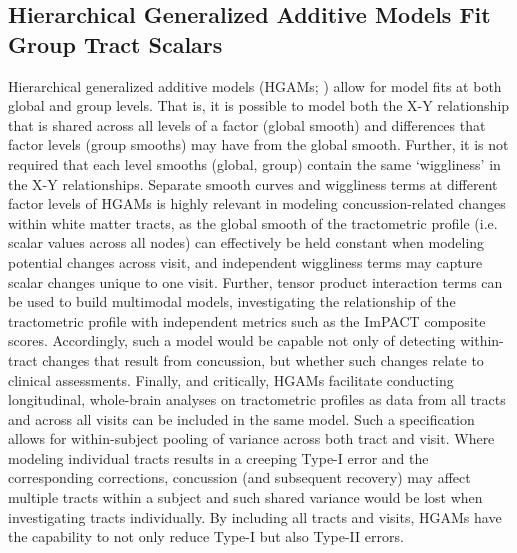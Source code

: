 \documentclass[]{imag-ms-template}
\begin{document}
\subsection{Hierarchical Generalized Additive Models Fit Group Tract Scalars}
\label{ssec:meth-gam}
Hierarchical generalized additive models (HGAMs; \cite{pedersen2019HierarchicalGeneralizedAdditive}) allow for model fits at both global and group levels. That is, it is possible to model both the X-Y relationship that is shared across all levels of a factor (global smooth) and differences that factor levels (group smooths) may have from the global smooth. Further, it is not required that each level smooths (global, group) contain the same `wiggliness' in the X-Y relationships. Separate smooth curves and wiggliness terms at different factor levels of HGAMs is highly relevant in modeling concussion-related changes within white matter tracts, as the global smooth of the tractometric profile (i.e. scalar values across all nodes) can effectively be held constant when modeling potential changes across visit, and independent wiggliness terms may capture scalar changes unique to one visit. Further, tensor product interaction terms can be used to build multimodal models, investigating the relationship of the tractometric profile with independent metrics such as the ImPACT composite scores. Accordingly, such a model would be capable not only of detecting within-tract changes that result from concussion, but whether such changes relate to clinical assessments. Finally, and critically, HGAMs facilitate conducting longitudinal, whole-brain analyses on tractometric profiles as data from all tracts and across all visits can be included in the same model. Such a specification allows for within-subject pooling of variance across both tract and visit. Where modeling individual tracts results in a creeping Type-I error and the corresponding corrections, concussion (and subsequent recovery) may affect multiple tracts within a subject and such shared variance would be lost when investigating tracts individually. By including all tracts and visits, HGAMs have the capability to not only reduce Type-I but also Type-II errors.
\end{document}
